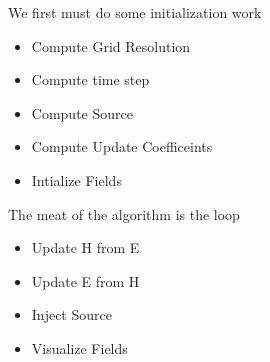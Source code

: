 \documentclass[a4paper,10pt]{article}
\begin{document}
We first must do some initialization work
\begin{itemize}
 \item Compute Grid Resolution
 \item Compute time step
 \item Compute Source
 \item Compute Update Coefficeints
 \item Intialize Fields
\end{itemize}


The meat of the algorithm is the loop

\begin{itemize} \item Update H from E
 \item Update E from H
 \item Inject Source
 \item Visualize Fields
\end{itemize}
\end{document}
